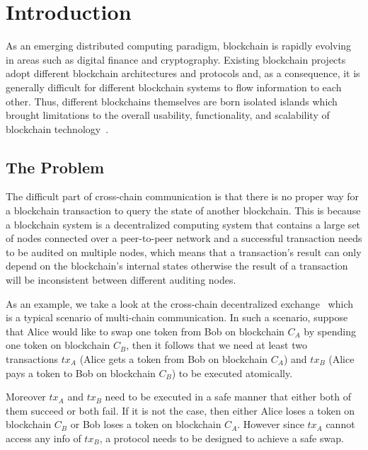 \section{Introduction}
As an emerging distributed computing paradigm, blockchain is rapidly evolving in areas such as digital finance and cryptography. Existing blockchain projects adopt different blockchain architectures and protocols and, as a consequence, it is generally difficult for different blockchain systems to flow information to each other. Thus, different blockchains themselves are born isolated islands which brought limitations to the overall usability, functionality, and scalability of blockchain technology~\cite{anati2013innovative}.

\subsection{The Problem}
The difficult part of cross-chain communication is that there is no proper way for a blockchain transaction to query the state of another blockchain. This is because a blockchain system is a decentralized computing system that contains a large set of nodes connected over a peer-to-peer network and a successful transaction needs to be audited on multiple nodes, which means that a transaction's result can only depend on the blockchain's internal states otherwise the result of a transaction will be inconsistent between different auditing nodes. 

As an example, we take a look at the cross-chain decentralized exchange~\cite{zetzsche2020decentralized} which is a typical scenario of multi-chain communication. In such a scenario, suppose that Alice would like to swap one token from Bob on blockchain $C_A$ by spending one token on blockchain $C_B$, then it follows that we need at least two transactions $tx_A$ (Alice gets a token from Bob on blockchain $C_A$) and $tx_B$ (Alice pays a token to Bob on blockchain $C_B$) to be executed atomically.

Moreover $tx_A$ and $tx_B$ need to be executed in a safe manner that either both of them succeed or both fail. If it is not the case, then either Alice loses a token on blockchain $C_B$ or Bob loses a token on blockchain $C_A$. However since $tx_A$ cannot access any info of $tx_B$, a protocol needs to be designed to achieve a safe swap.


